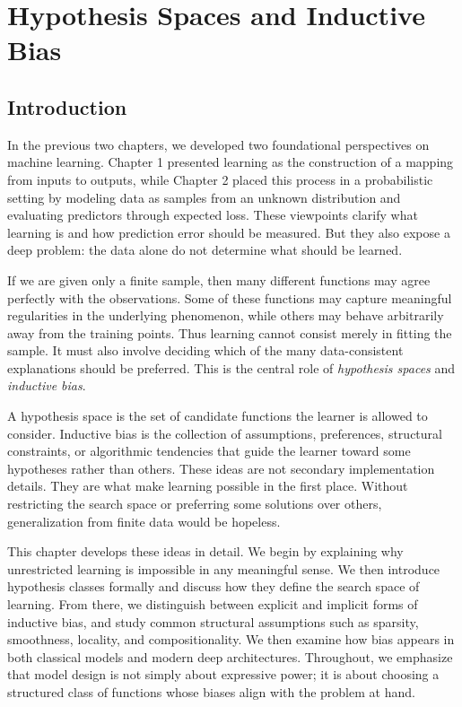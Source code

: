 \chapter{Hypothesis Spaces and Inductive Bias}

\section{Introduction}

In the previous two chapters, we developed two foundational perspectives on machine learning. Chapter 1 presented learning as the construction of a mapping from inputs to outputs, while Chapter 2 placed this process in a probabilistic setting by modeling data as samples from an unknown distribution and evaluating predictors through expected loss. These viewpoints clarify what learning is and how prediction error should be measured. But they also expose a deep problem: the data alone do not determine what should be learned.

If we are given only a finite sample, then many different functions may agree perfectly with the observations. Some of these functions may capture meaningful regularities in the underlying phenomenon, while others may behave arbitrarily away from the training points. Thus learning cannot consist merely in fitting the sample. It must also involve deciding which of the many data-consistent explanations should be preferred. This is the central role of \emph{hypothesis spaces} and \emph{inductive bias}.

A hypothesis space is the set of candidate functions the learner is allowed to consider. Inductive bias is the collection of assumptions, preferences, structural constraints, or algorithmic tendencies that guide the learner toward some hypotheses rather than others. These ideas are not secondary implementation details. They are what make learning possible in the first place. Without restricting the search space or preferring some solutions over others, generalization from finite data would be hopeless.

This chapter develops these ideas in detail. We begin by explaining why unrestricted learning is impossible in any meaningful sense. We then introduce hypothesis classes formally and discuss how they define the search space of learning. From there, we distinguish between explicit and implicit forms of inductive bias, and study common structural assumptions such as sparsity, smoothness, locality, and compositionality. We then examine how bias appears in both classical models and modern deep architectures. Throughout, we emphasize that model design is not simply about expressive power; it is about choosing a structured class of functions whose biases align with the problem at hand.

